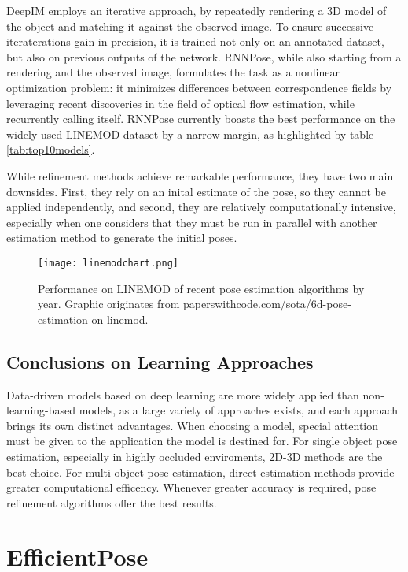 DeepIM\cite{DeepIM} employs an iterative approach, by repeatedly rendering a 3D model of the object and matching it against the observed image. To ensure successive iteraterations gain in precision, it is trained not only on an annotated dataset, but also on previous outputs of the network. RNNPose\cite{RNNPose}, while also starting from a rendering and the observed image, formulates the task as a nonlinear optimization problem: it minimizes differences between correspondence fields by leveraging recent discoveries in the field of optical flow estimation, while recurrently calling itself. RNNPose currently boasts the best performance on the widely used LINEMOD\cite{linemod} dataset by a narrow margin, as highlighted by table \ref{tab:top10models}.

While refinement methods achieve remarkable performance, they have two main downsides. First, they rely on an inital estimate of the pose, so they cannot be applied independently, and second, they are relatively computationally intensive, especially when one considers that they must be run in parallel with another estimation method to generate the initial poses.

\begin{figure}[ht]
    \centering
    \texttt{[image: linemodchart.png]}
    \caption{Performance on LINEMOD of recent pose estimation algorithms by year. Graphic originates from paperswithcode.com/sota/6d-pose-estimation-on-linemod.}
    \label{fig:linemodchart}
\end{figure}

\subsection{Conclusions on Learning Approaches}

Data-driven models based on deep learning are more widely applied than non-learning-based models, as a large variety of approaches exists, and each approach brings its own distinct advantages. When choosing a model, special attention must be given to the application the model is destined for. For single object pose estimation, especially in highly occluded enviroments, 2D-3D methods are the best choice. For multi-object pose estimation, direct estimation methods provide greater computational efficency. Whenever greater accuracy is required, pose refinement algorithms offer the best results.

\section{EfficientPose}

